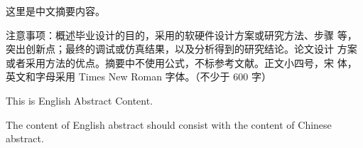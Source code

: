 \begin{thesisabstractcn}
    这里是中文摘要内容。\par%
    注意事项：概述毕业设计的目的，采用的软硬件设计方案或研究方法、步骤
    等，突出创新点；最终的调试或仿真结果，以及分析得到的研究结论。论文设计
    方案或者采用方法的优点。摘要中不使用公式，不标参考文献。正文小四号，宋
    体，英文和字母采用 Times New Roman 字体。（不少于 600 字）\par
\end{thesisabstractcn}
\begin{thesisabstracten}
    This is English Abstract Content.\par
    The content of English abstract should consist with the content of Chinese abstract.\par
\end{thesisabstracten}
